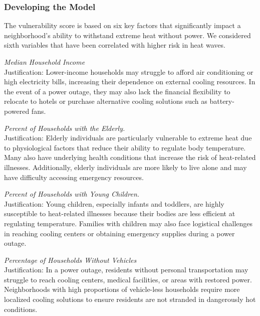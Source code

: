 \documentclass[12pt]{article}
\begin{document}
\subsubsection{Developing the Model}
\par
The vulnerability score is based on six key factors that significantly impact a neighborhood’s ability to withstand extreme heat without power. We considered sixth variables that have been correlated with higher risk in heat waves. \\
\begin{enumerate}
    \item{\textit{Median Household Income} \\Justification: Lower-income households may struggle to afford air conditioning or high electricity bills, increasing their dependence on external cooling resources. In the event of a power outage, they may also lack the financial flexibility to relocate to hotels or purchase alternative cooling solutions such as battery-powered fans.}\cite{https://www.kff.org/racial-equity-and-health-policy/issue-brief/disparities-in-access-to-air-conditioning-and-implications-for-heat-related-health-risks/}
    \item{\textit{Percent of Households with the Elderly.}\\ Justification: Elderly individuals are particularly vulnerable to extreme heat due to physiological factors that reduce their ability to regulate body temperature. Many also have underlying health conditions that increase the risk of heat-related illnesses. Additionally, elderly individuals are more likely to live alone and may have difficulty accessing emergency resources.\cite{https://pmc.ncbi.nlm.nih.gov/articles/PMC2900329/}
    \item{\textit{Percent of Households with Young Children.} \\Justification: Young children, especially infants and toddlers, are highly susceptible to heat-related illnesses because their bodies are less efficient at regulating temperature. Families with children may also face logistical challenges in reaching cooling centers or obtaining emergency supplies during a power outage.\cite{https://www.epa.gov/children/protecting-childrens-health-during-and-after-natural-disasters-extreme-heat}
    \item{\textit{Percentage of Households Without Vehicles} \\Justification: In a power outage, residents without personal transportation may struggle to reach cooling centers, medical facilities, or areas with restored power. Neighborhoods with high proportions of vehicle-less households require more localized cooling solutions to ensure residents are not stranded in dangerously hot conditions.}\cite{https://nyaspubs.onlinelibrary.wiley.com/doi/full/10.1111/nyas.15115}
}}
\end{enumerate}
\end{document}
